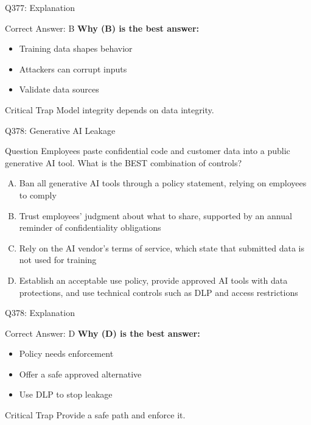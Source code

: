 \documentclass{beamer}
\begin{document}
	\begin{frame}{Q377: Explanation}
		\begin{block}{Correct Answer: B}
			\textbf{Why (B) is the best answer:}
			\begin{itemize}
				\item Training data shapes behavior
				\item Attackers can corrupt inputs
				\item Validate data sources
			\end{itemize}
		\end{block}
		\begin{alertblock}{Critical Trap}
			Model integrity depends on data integrity.
		\end{alertblock}
	\end{frame}
	
	\begin{frame}{Q378: Generative AI Leakage}
		\begin{block}{Question}
			\small Employees paste confidential code and customer data into a public generative AI tool. What is the BEST combination of controls?
		\end{block}
		\begin{enumerate}[(A)]
			\footnotesize
			\item Ban all generative AI tools through a policy statement, relying on employees to comply
			\item Trust employees' judgment about what to share, supported by an annual reminder of confidentiality obligations
			\item Rely on the AI vendor's terms of service, which state that submitted data is not used for training
			\item Establish an acceptable use policy, provide approved AI tools with data protections, and use technical controls such as DLP and access restrictions
		\end{enumerate}
	\end{frame}
	
	\begin{frame}{Q378: Explanation}
		\begin{block}{Correct Answer: D}
			\textbf{Why (D) is the best answer:}
			\begin{itemize}
				\item Policy needs enforcement
				\item Offer a safe approved alternative
				\item Use DLP to stop leakage
			\end{itemize}
		\end{block}
		\begin{alertblock}{Critical Trap}
			Provide a safe path and enforce it.
		\end{alertblock}
	\end{frame}
	
\end{document}
